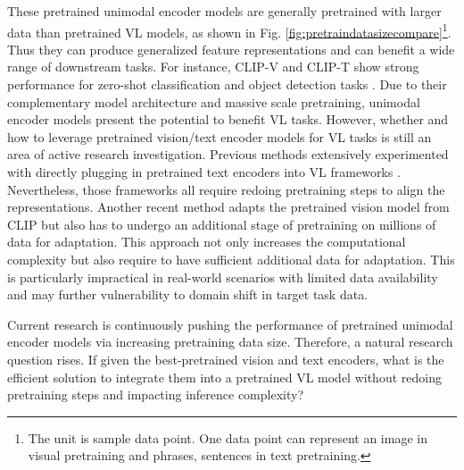 \documentclass[runningheads]{llncs}
\begin{document}
These pretrained unimodal encoder models are generally pretrained with larger data than pretrained VL models, as shown in Fig. \ref{fig:pretraindatasizecompare}\footnote{The unit is sample data point. One data point can represent an image in visual pretraining and phrases, sentences in text pretraining.}. Thus they can produce generalized feature representations and can benefit a wide range of downstream tasks. For instance, CLIP-V and CLIP-T show strong performance for zero-shot classification and object detection tasks \cite{zhong2021regionclip}. Due to their complementary model architecture and massive scale pretraining, unimodal encoder models present the potential to benefit VL tasks.
However, whether and how to leverage pretrained vision/text encoder models for VL tasks is still an area of active research investigation. Previous methods extensively experimented with directly plugging in pretrained text encoders into VL frameworks \cite{wang2021simvlm,chen2020uniter,Su2020VL-BERT,gan2020large,huang2021seeing,huang2020pixel,lxmert,wang2021sgeitl}. Nevertheless, those frameworks all require redoing pretraining steps to align the representations. Another recent method \cite{shen2021clip} adapts the pretrained vision model from CLIP \cite{clip} but also has to undergo an additional stage of pretraining on millions of data for adaptation. This approach not only increases the computational complexity but also require to have sufficient additional data for adaptation. This is particularly impractical in real-world scenarios with limited data availability and may further vulnerability to domain shift in target task data.




Current research is continuously pushing the performance of pretrained unimodal encoder models via increasing pretraining data size. Therefore, a natural research question rises. If given the best-pretrained vision and text encoders, what is the efficient solution to integrate them into a pretrained VL model without redoing pretraining steps and impacting inference complexity?
\end{document}
